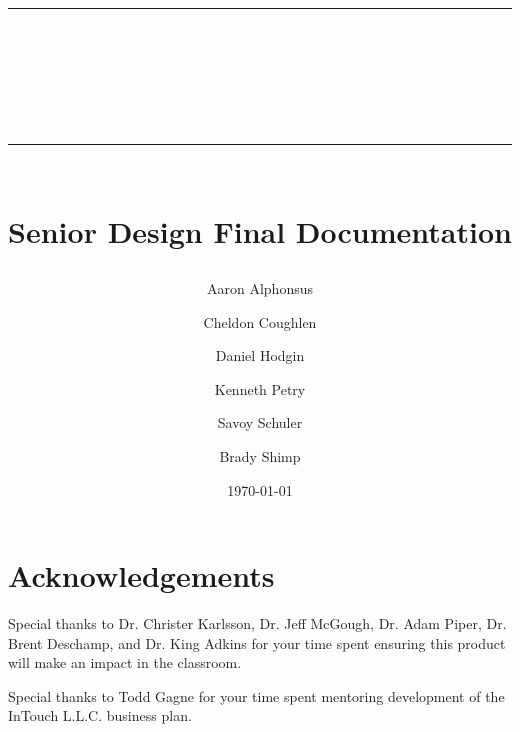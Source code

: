 \documentclass{book}
\title{{\color{SDColor3} \rule{\linewidth}{0.5mm}}\\[2mm] {\huge \bfseries \color{SDColor3} \teamName}\\[-1mm] {\color{SDColor3}\rule{\linewidth}{0.5mm}} \\  \vfill
{\LARGE \bfseries \color{SDColor4} Senior Design Final Documentation }\\  \vfill 
{\color{SDColor3} \teamName} }
\author
{
	\color{SDColor3} Aaron Alphonsus 
	\and \color{SDColor3} Cheldon Coughlen 
	\and \color{SDColor3} Daniel Hodgin 
	\and \color{SDColor3} Kenneth Petry 
	\and \color{SDColor3} Savoy Schuler
	\and \color{SDColor3} Brady Shimp
}
\date{\color{SDColor3} \today}
\begin{document}
\frontmatter

\maketitle

\vspace*{\fill}
\section*{Acknowledgements}
\label{SpecialThanks}  
Special thanks to Dr. Christer Karlsson, Dr. Jeff McGough, Dr. Adam Piper, Dr. Brent Deschamp, and Dr. King Adkins for your time spent ensuring this product will make an impact in the classroom.
\vspace{\baselineskip}

Special thanks to Todd Gagne for your time spent mentoring development of the InTouch L.L.C. business plan. 
\vspace*{\fill}

\tableofcontents
{}
\listoffigures
{}
\listoftables
{}

% 

\mainmatter



%
%
\end{document}
